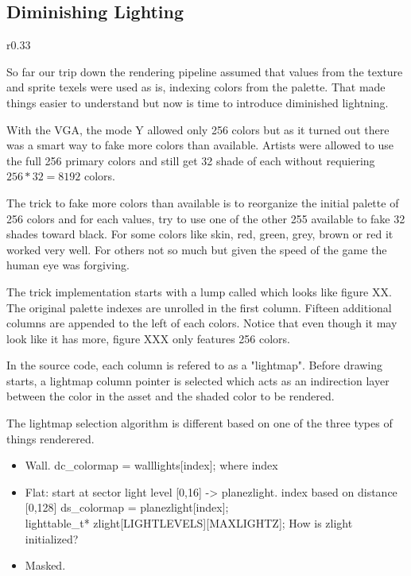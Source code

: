 \subsection{Diminishing Lighting}
\begin{wrapfigure}[11]{r}{0.33\textwidth}
\centering
{}
\end{wrapfigure}
So far our trip down the rendering pipeline assumed that values from the texture and sprite texels were used as is, indexing colors from the palette. That made things easier to understand but now is time to introduce diminished lightning.\\
\par
With the VGA, the mode Y allowed only 256 colors but as it turned out there was a smart way to fake more colors than available. Artists were allowed to use the full 256 primary colors and still get 32 shade of each without requiering $256 * 32 = 8192$ colors.\\
\par
 The trick to fake more colors than available is to reorganize the initial palette of 256 colors and for each values, try to use one of the other 255 available to fake 32 shades toward black. For some colors like skin, red, green, grey, brown or red it worked very well. For others not so much but given the speed of the game the human eye was forgiving.\\
 \par
 The trick implementation starts with a lump called  which looks like figure XX. The original palette indexes are unrolled in the first column. Fifteen additional columns are appended to the left of each colors. Notice that even though it may look like it has more, figure XXX only features 256 colors.\\
\par
In the source code, each column is refered to as a "lightmap". Before drawing starts, a lightmap column pointer is selected which acts as an indirection layer between the color in the asset and the shaded color to be rendered.\\
\par
{}
\par
The lightmap selection algorithm is different based on one of the three types of things renderered.\\
\par
\begin{itemize}
\item Wall. dc\_colormap = walllights[index]; where index 
\item Flat: start at sector light level [0,16] -> planezlight. index based on distance [0,128] ds\_colormap = planezlight[index];\\ lighttable\_t*    zlight[LIGHTLEVELS][MAXLIGHTZ]; How is zlight initialized?
\item Masked.
\end{itemize}
\par
{}
\par




